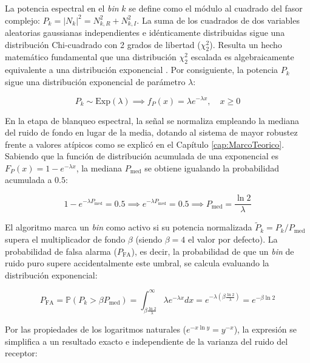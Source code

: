 La potencia espectral en el \textit{bin} $k$ se define como el módulo al cuadrado del fasor complejo: $P_k = |N_k|^2 = N_{k,R}^2 + N_{k,I}^2$. La suma de los cuadrados de dos variables aleatorias gaussianas independientes e idénticamente distribuidas sigue una distribución Chi-cuadrado con 2 grados de libertad ($\chi^2_2$). Resulta un hecho matemático fundamental que una distribución $\chi^2_2$ escalada es algebraicamente equivalente a una distribución exponencial \cite{kay_fundamentals_1998}. Por consiguiente, la potencia $P_k$ sigue una distribución exponencial de parámetro $\lambda$:

\begin{equation}
    P_k \sim \text{Exp}(\lambda) \implies f_{P}(x) = \lambda e^{-\lambda x}, \quad x \ge 0
\end{equation}

En la etapa de blanqueo espectral, la señal se normaliza empleando la mediana del ruido de fondo en lugar de la media, dotando al sistema de mayor robustez frente a valores atípicos como se explicó en el Capítulo \ref{cap:MarcoTeorico}. Sabiendo que la función de distribución acumulada de una exponencial es $F_P(x) = 1 - e^{-\lambda x}$, la mediana $P_{\text{med}}$ se obtiene igualando la probabilidad acumulada a $0.5$:

\begin{equation}
    1 - e^{-\lambda P_{\text{med}}} = 0.5 \implies e^{-\lambda P_{\text{med}}} = 0.5 \implies P_{\text{med}} = \frac{\ln 2}{\lambda}
\end{equation}

El algoritmo marca un \textit{bin} como activo si su potencia normalizada $\tilde{P}_k = P_k / P_{\text{med}}$ supera el multiplicador de fondo $\beta$ (siendo $\beta = 4$ el valor por defecto). La probabilidad de falsa alarma ($P_{\text{FA}}$), es decir, la probabilidad de que un \textit{bin} de ruido puro supere accidentalmente este umbral, se calcula evaluando la distribución exponencial:

\begin{equation}
    P_{\text{FA}} = \mathbb{P}\left(P_k > \beta P_{\text{med}}\right) = \int_{\beta \frac{\ln 2}{\lambda}}^{\infty} \lambda e^{-\lambda x} dx = e^{-\lambda \left(\beta \frac{\ln 2}{\lambda}\right)} = e^{-\beta \ln 2}
\end{equation}

Por las propiedades de los logaritmos naturales ($e^{-x \ln y} = y^{-x}$), la expresión se simplifica a un resultado exacto e independiente de la varianza del ruido del receptor:


